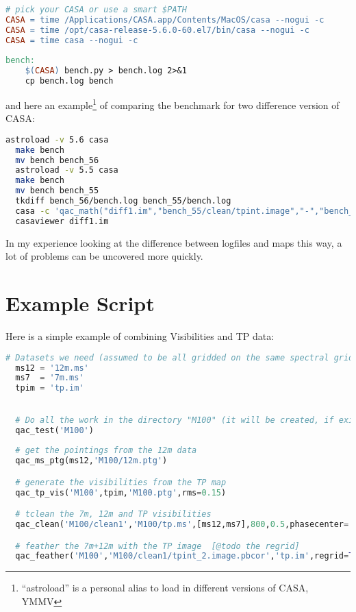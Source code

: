\documentclass[12pt,a4paper]{article}
\begin{document}
\begin{lstlisting}[language=make]
  # pick your CASA or use a smart $PATH
CASA = time /Applications/CASA.app/Contents/MacOS/casa --nogui -c
CASA = time /opt/casa-release-5.6.0-60.el7/bin/casa --nogui -c
CASA = time casa --nogui -c
  
bench:
    $(CASA) bench.py > bench.log 2>&1
    cp bench.log bench
\end{lstlisting}

and here an example\footnote{``astroload'' is a personal alias to load in different versions of CASA, YMMV} of comparing the
benchmark for two difference version of CASA:

\begin{lstlisting}[language=bash]
  astroload -v 5.6 casa
  make bench
  mv bench bench_56
  astroload -v 5.5 casa
  make bench
  mv bench bench_55
  tkdiff bench_56/bench.log bench_55/bench.log
  casa -c 'qac_math("diff1.im","bench_55/clean/tpint.image","-","bench_56/clean/tpint.image")'
  casaviewer diff1.im
\end{lstlisting}

In my experience looking at the difference between logfiles and maps this way, a lot of problems can be uncovered more quickly.

\section{Example Script}

Here is a simple example of combining Visibilities and TP data:

\begin{lstlisting}[language=Python]
  # Datasets we need (assumed to be all gridded on the same spectral grid)
  ms12 = '12m.ms'
  ms7  = '7m.ms'
  tpim = 'tp.im'

  
  # Do all the work in the directory "M100" (it will be created, if exists, all contents removed)
  qac_test('M100')
  
  # get the pointings from the 12m data
  qac_ms_ptg(ms12,'M100/12m.ptg')

  # generate the visibilities from the TP map
  qac_tp_vis('M100',tpim,'M100.ptg',rms=0.15)

  # tclean the 7m, 12m and TP visibilities
  qac_clean('M100/clean1','M100/tp.ms',[ms12,ms7],800,0.5,phasecenter='J2000 12h22m54.900s +15d49m15.000s',niter=[0,10000])

  # feather the 7m+12m with the TP image  [@todo the regrid]
  qac_feather('M100','M100/clean1/tpint_2.image.pbcor','tp.im',regrid=True)

\end{lstlisting}
\end{document}
